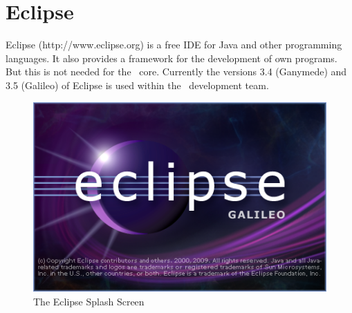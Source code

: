 \section{Eclipse}

Eclipse (http://www.eclipse.org) is a free IDE for Java and other
programming languages. It also provides a framework for the
development of own programs. But this is not needed for the \ExTeX\ 
core. Currently the versions 3.4 (Ganymede) and 3.5 (Galileo) of
Eclipse is used within the \ExTeX\ development team.
\begin{figure}[h]
  \centering  \includegraphics[scale=.5]{image/eclipse-splash}
  \caption{The Eclipse Splash Screen}\label{fig:eclipse}
\end{figure}

